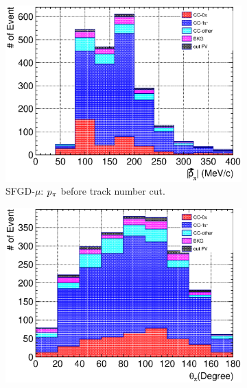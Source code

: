 \begin{figure}
\begin{subfigure}{\dbfigwid\textwidth}
                    \label{subfig:tlpi-tpi-af-trknumcut-tpc}
               \end{subfigure}
               \\
               \begin{subfigure}{\dbfigwid\textwidth}
                    \includegraphics[width=\textwidth]{figures/sel/SFGmu_p_pi_stack_al8.eps}
                    \caption{SFGD-$\mu$: $p_{\pi}$ before track number cut.}
                    \label{subfig:tlpi-ppi-bf-trknumcut-sfg}
               \end{subfigure}
               \begin{subfigure}{\dbfigwid\textwidth}
                    \includegraphics[width=\textwidth]{figures/sel/SFGmu_theta_pi_stack_al8.eps}

\end{subfigure}
\end{figure}
